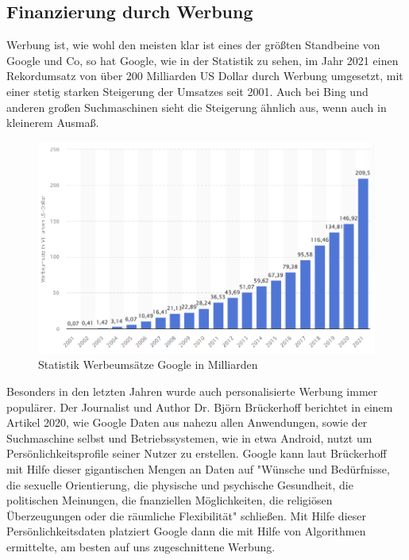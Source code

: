 \documentclass[11pt]{report}
\begin{document}
    \subsection{Finanzierung durch Werbung}\label{subsec:finanzierung-durch-werbung}
    Werbung ist, wie wohl den meisten klar ist eines der größten Standbeine von Google und Co, so hat Google, wie in der Statistik zu sehen, im Jahr 2021 einen Rekordumsatz von über 200 Milliarden US Dollar durch Werbung umgesetzt, mit einer stetig starken Steigerung der Umsatzes seit 2001.
    Auch bei Bing und anderen großen Suchmaschinen sieht die Steigerung ähnlich aus, wenn auch in kleinerem Ausmaß.
    \begin{figure}[h]
        \centering
        \includegraphics[width=120mm]{images/statistic_google_ads}
        \caption{Statistik Werbeumsätze Google in Milliarden}
        \label{fig:statisticAdsGoogle}
    \end{figure}
    Besonders in den letzten Jahren wurde auch personalisierte Werbung immer populärer.
    Der Journalist und Author Dr. Björn Brückerhoff berichtet in einem Artikel 2020, wie Google Daten aus nahezu allen Anwendungen, sowie der Suchmaschine selbst und Betriebssystemen, wie in etwa Android, nutzt um Persönlichkeitsprofile seiner Nutzer zu erstellen.
    Google kann laut Brückerhoff mit Hilfe dieser gigantischen Mengen an Daten auf "Wünsche und Bedürfnisse, die sexuelle Orientierung, die physische und psychische Gesundheit, die politischen Meinungen, die fnanziellen Möglichkeiten, die religiösen Überzeugungen oder die räumliche Flexibilität"\cite{[BRK20]} schließen.
    Mit Hilfe dieser Persönlichkeitsdaten platziert Google dann die mit Hilfe von Algorithmen ermittelte, am besten auf uns zugeschnittene Werbung.\cite{[BRK20]}\\
\end{document}
